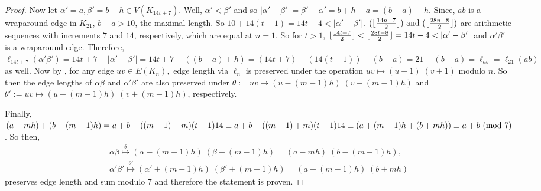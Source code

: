 \begin{thm}
\begin{proof}
        Now let $\alpha' = a, \beta' = b+h\in V(K_{14t+7})$. Well, $\alpha'<\beta'$ and so $|\alpha'-\beta'|=\beta'-\alpha'=b+h-a=(b-a)+h$. Since, $ab$ is a wraparound edge in $K_{21}$, $b-a>10$, the maximal length. So $10+14(t-1)=14t-4<|\alpha'-\beta'|$. $(\lfloor\frac{14n+7}{2}\rfloor)\text{ and }(\lfloor\frac{28n-8}{2}\rfloor)$ are arithmetic sequences with increments $7$ and $14$, respectively, which are equal at $n=1$. So for $t>1$, $\floor{\frac{14t+7}{2}}<\floor{\frac{28t-8}{2}}=14t-4<|\alpha'-\beta'|$ and $\alpha'\beta'$ is a wraparound edge. Therefore, $\ell_{14t+7}(\alpha'\beta')=14t+7-|\alpha'-\beta'|=14t+7-((b-a)+h)=(14t+7)-(14(t-1))-(b-a)=21-(b-a)=\ell_{ab}=\ell_{21}(ab)$ as well. Now by \cite{FreyTran}, for any edge $uv\in E(K_{n}),$ edge length via $\ell_{n}$ is preserved under the operation $uv\mapsto (u+1)\;(v+1)$ modulo $n$. So then the edge lengths of $\alpha\beta$ and $\alpha'\beta'$ are also preserved under $\theta:=uv\mapsto (u-(m-1)h)\;(v-(m-1)h)$ and $\theta':=uv\mapsto (u+(m-1)h)\;(v+(m-1)h)$, respectively.
        
        Finally, $(a-mh)+(b-(m-1)h)=a+b+((m-1)-m)(t-1)14\equiv a+b+((m-1)+m)(t-1)14\equiv (a+(m-1)h + (b+mh))\equiv a+b\ (\mathrm{mod}\ 7)$. So then,
        \begin{align*}
            \alpha\beta\overset{\theta}{\mapsto} (\alpha-(m-1)h)\;(\beta-(m-1)h)=(a-mh)\;(b-(m-1)h),\\
            \alpha'\beta'\overset{\theta'}{\mapsto} (\alpha'+(m-1)h)\;(\beta'+(m-1)h)=(a+(m-1)h)\;(b+mh)
        \end{align*}
        preserves edge length and sum modulo 7 and therefore the statement is proven.
        
    \end{proof}
\end{thm}
\newpage
